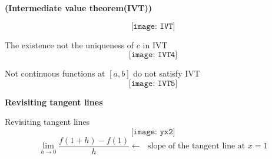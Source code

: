 \documentclass{beamer}
\begin{document}
\begin{frame}

\begin{theorem}{\bf (Intermediate value theorem(IVT))} 
\end{theorem}

$$
\texttt{[image: IVT]}
$$
\end{frame}

\begin{frame}{The existence not the uniqueness of $c$ in IVT}
$$
\texttt{[image: IVT4]}
$$
\end{frame}

\begin{frame}{Not continuous functions at $[a,b]$ do not satisfy IVT}
$$
\texttt{[image: IVT5]}
$$
\end{frame}


\begin{frame}
\begin{center}
	{\bf \color{blue}Revisiting tangent lines}
\end{center}
\end{frame}

\begin{frame}{Revisiting tangent lines}
$$
\texttt{[image: yx2]}
$$
$$ \lim_{h\to 0}\frac{f(1+h)-f(1)}{h} \leftarrow \text{~ slope of the tangent line at $x=1$}$$
\end{frame}



%
%
\end{document}
